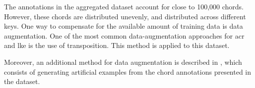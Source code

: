 

The annotations in the aggregated dataset account for close
to 100,000 chords. However, these chords are distributed
unevenly, and distributed across different keys. One way to
compensate for the available amount of training data is data
augmentation. One of the most common data-augmentation
approaches for \gls{acr} and \gls{lke} is the use of
transposition. This method is applied to this dataset.

Moreover, an additional method for data augmentation is
described in ,
which consists of generating artificial examples from the
chord annotations presented in the dataset.